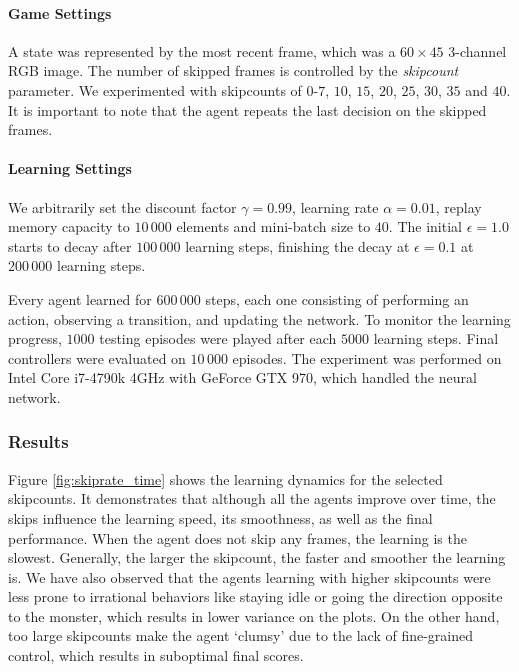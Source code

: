 \documentclass[english,american,conference, balance]{IEEEtran}
\begin{document}
\paragraph{Game Settings}

A state was represented by the most recent frame, which was a $60\times45$
$3$-channel RGB image. The number of skipped frames is controlled
by the \emph{skipcount} parameter. We experimented with skipcounts\emph{
}of $0$-$7$, $10$, $15$, $20$, $25$, $30$, $35$ and $40$.
It is important to note that the agent repeats the last decision on
the skipped frames.

\paragraph{Learning Settings}

We arbitrarily set the discount factor $\gamma=0.99$, learning rate
$\alpha=0.01$, replay memory capacity to $10\,000$ elements and
mini-batch size to $40$. The initial $\epsilon=1.0$ starts to decay
after $100\,000$ learning steps, finishing the decay at $\epsilon=0.1$
at $200\,000$ learning steps.

Every agent learned for $600\,000$ steps, each one consisting of
performing an action, observing a transition, and updating the network.
To monitor the learning progress, $1000$ testing episodes were played
after each $5000$ learning steps. Final controllers were evaluated
on $10\,000$ episodes. The experiment was performed on Intel Core
i7-4790k 4GHz with GeForce GTX 970, which handled the neural network.

\subsubsection{Results}

Figure \ref{fig:skiprate_time} shows the learning dynamics for the
selected skipcounts. It demonstrates that although all the agents
improve over time, the skips influence the learning speed, its smoothness,
as well as the final performance. When the agent does not skip any
frames, the learning is the slowest. Generally, the larger the skipcount,
the faster and smoother the learning is. We have also observed that
the agents learning with higher skipcounts were less prone to irrational
behaviors like staying idle or going the direction opposite to the
monster, which results in lower variance on the plots. On the other
hand, too large skipcounts make the agent `clumsy' due to the lack
of fine-grained control, which results in suboptimal final scores. 
\end{document}

